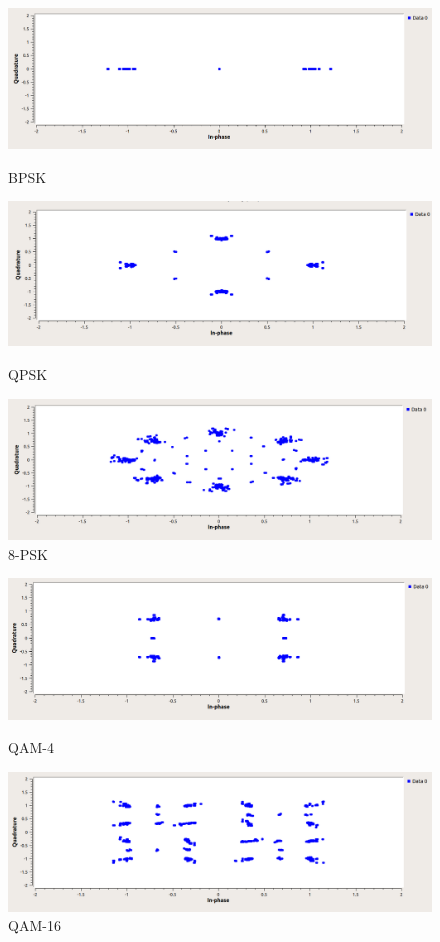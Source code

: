 \begin{figure}[!htb]
	\includegraphics[width=\linewidth]{pics/BPSK}
	\caption{BPSK}\label{fig:BPSK}
	\endminipage\hfill
	\includegraphics[width=\linewidth]{pics/QPSK}
	\caption{QPSK}\label{fig:QPSK}
	\endminipage\hfill
	\includegraphics[width=\linewidth]{pics/8-PSK}
	\caption{8-PSK}\label{fig:8-PSK}
	\endminipage
\end{figure}

\begin{figure}[!htb]
	\includegraphics[width=\linewidth]{pics/QAM-4}
	\caption{QAM-4}\label{fig:QAM-4}
	\endminipage\hfill
	\includegraphics[width=\linewidth]{pics/QAM-16}
	\caption{QAM-16}\label{fig:QAM-16}
	\endminipage\hfill
\end{figure}

